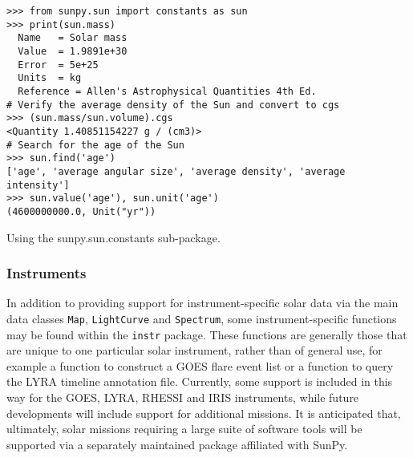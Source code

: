 \begin{listing}[H]
\begin{verbatim}
>>> from sunpy.sun import constants as sun
>>> print(sun.mass)
  Name   = Solar mass
  Value  = 1.9891e+30
  Error  = 5e+25
  Units  = kg
  Reference = Allen's Astrophysical Quantities 4th Ed.
# Verify the average density of the Sun and convert to cgs
>>> (sun.mass/sun.volume).cgs
<Quantity 1.40851154227 g / (cm3)>
# Search for the age of the Sun
>>> sun.find('age')
['age', 'average angular size', 'average density', 'average intensity']
>>> sun.value('age'), sun.unit('age')
(4600000000.0, Unit("yr"))
\end{verbatim}
\caption{Using the sunpy.sun.constants sub-package.}
\label{code:constants_code}
\end{listing}
	
\subsubsection{Instruments}\label{ssec:util:inst}
In addition to providing support for instrument-specific solar data via the main data 
classes \texttt{Map}, \texttt{LightCurve} and \texttt{Spectrum}, 
some instrument-specific functions may be found within the \texttt{instr} package. 
These functions are generally those that are unique to one particular solar instrument, 
rather than of general use, for example a function to construct a GOES flare event list 
or a function to query the LYRA timeline annotation file. Currently, some support is included
 in this way for the GOES, LYRA, RHESSI and IRIS instruments, while future developments 
 will include support for additional missions. It is anticipated that, ultimately, solar
  missions requiring a large suite of software tools will be supported via a separately 
  maintained package affiliated with SunPy.

